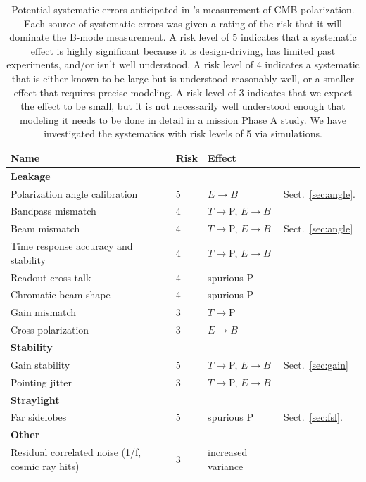 \documentclass[PICOReport.tex]{subfiles}
\begin{document}
\begin{table}[h!]
\hspace{-0.1in}
\parbox{3.4in}{
\centering
\scriptsize
 \begin{tabular}{p{3.3cm} p{0.5cm} p{1.4cm} p{1.7cm}}
 \hline
\textbf{Name} & \textbf{Risk}&\textbf{Effect} \\
 \hline
\textbf{Leakage}& &\\
Polarization angle calibration\dotfill& 
5&
$E{\to}B$ &
Sect.~\ref{sec:angle}.
\\
 Bandpass mismatch\dotfill&
 4& 
$T{\to}$P, $E{\to}B$  
   \\
Beam mismatch\dotfill& 
4&
$T{\to}$P, $E{\to}B$
& Sect.~\ref{sec:angle}
\\
Time response accuracy and stability\dotfill&
4&
$T{\to}$P, $E{\to}B$
\\
Readout cross-talk\dotfill& 
4&
spurious P
\\
Chromatic beam shape\dotfill&
4&
spurious P
\\

Gain mismatch\dotfill&
3&
$T{\to}$P   
\\


Cross-polarization\dotfill&
3&
$E{\to}B$
\\
\hline 
\textbf{Stability} & & \\
Gain stability\dotfill& 
5&
$T{\to}$P, $E{\to} B$
& 
Sect.~\ref{sec:gain}
\\
Pointing jitter\dotfill&
3&
$T{\to}$P, $E{\to}B$
\\

\hline
\textbf{Straylight}& & \\
Far sidelobes\dotfill& 
5&
spurious P
&
Sect.~\ref{sec:fsl}.\\
 \hline
\textbf{Other} \\
Residual correlated noise (1/f, cosmic ray hits)\dotfill&
3 &
increased variance
\\
\hline
 \end{tabular}
}
\hspace{-0.0in}
\parbox{3.1in}{
\caption{\captiontext
Potential systematic errors anticipated in \pico's measurement of CMB polarization. Each source of systematic errors was given a rating of the risk that it will dominate the B-mode measurement.  A risk level of 5 indicates that a systematic effect is highly significant because it is design-driving, has limited past experiments, and/or isn$^\prime$t well understood.  A risk level of 4 indicates a systematic that is either known to be large but is understood reasonably well, or a smaller effect that requires precise modeling.  A risk level of 3 indicates that we expect the effect to be small, but it is not necessarily well understood enough that modeling it needs to be done in detail in a mission Phase A study. We have investigated the systematics with risk levels of 5 via simulations.
\label{tbl:SystematicsList2col} }}
\hspace{-0.0in}
\end{table}
\end{document}

